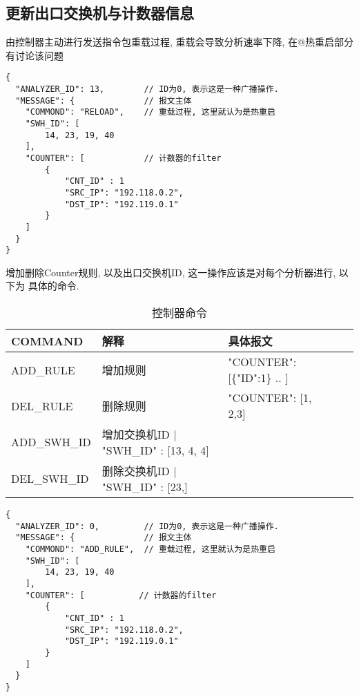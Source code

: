 \subsection{更新出口交换机与计数器信息}

由控制器主动进行发送指令包重载过程, 重载会导致分析速率下降,
在@热重启部分有讨论该问题

\begin{lstlisting}
{
  "ANALYZER_ID": 13,        // ID为0, 表示这是一种广播操作.
  "MESSAGE": {              // 报文主体
    "COMMOND": "RELOAD",    // 重载过程, 这里就认为是热重启
    "SWH_ID": [
        14, 23, 19, 40
    ],
    "COUNTER": [            // 计数器的filter
        {
            "CNT_ID" : 1
            "SRC_IP": "192.118.0.2",
            "DST_IP": "192.119.0.1"
        }
    ]
  }
}
\end{lstlisting}

增加删除Counter规则, 以及出口交换机ID, 这一操作应该是对每个分析器进行, 以下为
具体的命令.


\begin{table}[]
    \centering
    \caption{控制器命令}
    \label{tbl:message}
    \begin{tabular}{lllll}
    COMMAND      & 解释                                   & 具体报文                            \\ \hline
    ADD\_RULE    & 增加规则                                 & "COUNTER": {[}\{"ID":1\} .. {]}  \\
    DEL\_RULE    & 删除规则                                 & "COUNTER": {[}1, 2,3{]}          \\
    ADD\_SWH\_ID & 增加交换机ID | "SWH\_ID" : {[}13, 4, 4{]} &                                 \\
    DEL\_SWH\_ID & 删除交换机ID | "SWH\_ID" : {[}23,{]}      &                                \\ \hline
    \end{tabular}
\end{table}

\begin{lstlisting}
{
  "ANALYZER_ID": 0,         // ID为0, 表示这是一种广播操作.
  "MESSAGE": {              // 报文主体
    "COMMOND": "ADD_RULE",  // 重载过程, 这里就认为是热重启
    "SWH_ID": [
        14, 23, 19, 40
    ],
    "COUNTER": [           // 计数器的filter
        {
            "CNT_ID" : 1
            "SRC_IP": "192.118.0.2",
            "DST_IP": "192.119.0.1"
        }
    ]
  }
}
\end{lstlisting}

